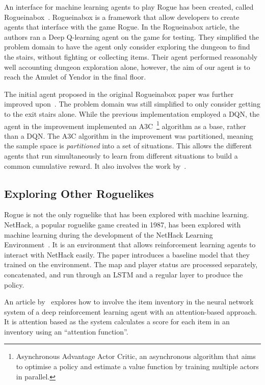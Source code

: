 \documentclass[12pt,a4paper]{article}
\begin{document}
    An interface for machine learning agents to play Rogue has been created, called Rogueinabox~\citep{asperti17}.
    Rogueinabox is a framework that allow developers to create agents that interface with the game Rogue.
    In the Rogueinabox article, the authors ran a Deep Q-learning agent on the game for testing.
    They simplified the problem domain to have the agent only consider exploring the dungeon to find the stairs, without fighting or collecting items.
    Their agent performed reasonably well accounting dungeon exploration alone, however, the aim of our agent is to reach the Amulet of Yendor in the final floor.

    The initial agent proposed in the original Rogueinabox paper was further improved upon~\citep{asperti18}.
    The problem domain was still simplified to only consider getting to the exit stairs alone.
    While the previous implementation employed a DQN, the agent in the improvement implemented an A3C~\citep{mnih15}\footnote{Asynchronous Advantage Actor Critic, an asynchronous algorithm that aims to optimise a policy and estimate a value function by training multiple actors in parallel.} algorithm as a base, rather than a DQN. The A3C algorithm in the improvement was partitioned, meaning the sample space is \emph{partitioned} into a set of situations.
    This allows the different agents that run simultaneously to learn from different situations to build a common cumulative reward.
    It also involves the work by~\citet{jaderberg16}.

    \subsection{Exploring Other Roguelikes}\label{subsec:exploring-other-roguelikes}
    Rogue is not the only roguelike that has been explored with machine learning.
    NetHack, a popular roguelike game created in 1987, has been explored with machine learning during the development of the NetHack Learning Environment~\citep{kuttler20}.
    It is an environment that allows reinforcement learning agents to interact with NetHack easily.
    The paper introduces a baseline model that they trained on the environment.
    The map and player status are processed separately, concatenated, and run through an LSTM and a regular layer to produce the policy.

    An article by~\citet{izumiya21} explores how to involve the item inventory in the neural network system of a deep reinforcement learning agent with an attention-based approach.
    It is attention based as the system calculates a score for each item in an inventory using an ``attention function''.
\end{document}
